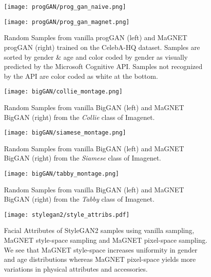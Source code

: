 \clearpage
\begin{figure}[h]
    \centering
    \begin{minipage}{0.48\linewidth}
    \texttt{[image: progGAN/prog\_gan\_naive.png]}
    \end{minipage}
    \begin{minipage}{0.48\linewidth}
    \texttt{[image: progGAN/prog\_gan\_magnet.png]}
    \end{minipage}
    \caption{Random Samples from vanilla progGAN (left) and MaGNET progGAN (right) trained on the CelebA-HQ dataset. Samples are sorted by gender \& age and color coded by gender as visually predicted by the Microsoft Cognitive API. Samples not recognized by the API are color coded as white at the bottom. }
    \label{fig:progganfull}
\end{figure}

\newpage
\clearpage
\begin{figure}[h]
    \centering
    \texttt{[image: bigGAN/collie\_montage.png]}
    \caption{Random Samples from vanilla BigGAN (left) and MaGNET BigGAN (right) from the \emph{Collie} class of Imagenet.}
    \label{fig:collie}
\end{figure}



\newpage
\clearpage
\begin{figure}[h]
    \centering
    \texttt{[image: bigGAN/siamese\_montage.png]}
    \caption{Random Samples from vanilla BigGAN (left) and MaGNET BigGAN (right) from the \emph{Siamese} class of Imagenet.}
    \label{fig:siamese}
\end{figure}

\newpage
\clearpage
\begin{figure}[h]
    \centering
    \texttt{[image: bigGAN/tabby\_montage.png]}
    \caption{Random Samples from vanilla BigGAN (left) and MaGNET BigGAN (right) from the \emph{Tabby} class of Imagenet.}
    \label{fig:tabby}
\end{figure}




\newpage

\begin{figure}[t!]
    \centering
    \texttt{[image: stylegan2/style\_attribs.pdf]}
    \small
    \caption{Facial Attributes of  StyleGAN2 samples using vanilla sampling, MaGNET style-space sampling and  MaGNET pixel-space sampling. We see that MaGNET style-space increases uniformity in gender and age distributions whereas MaGNET pixel-space yields more variations in physical attributes and accessories.}
    \label{fig:stylegan2_attributes}
\end{figure}

